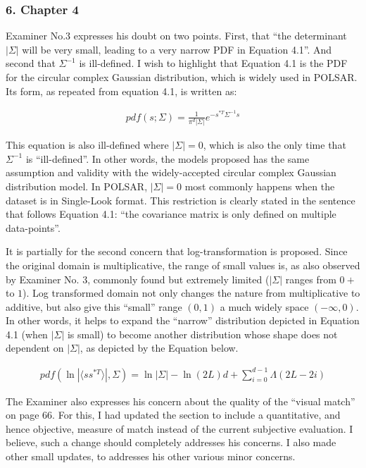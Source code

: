 \subsubsection*{6. Chapter 4}

Examiner No.3 expresses his doubt on two points.
First, that ``the determinant $|\Sigma|$ will be very small, leading to a very narrow PDF in Equation 4.1''.
And second that $\Sigma^{-1}$ is ill-defined.
I wish to highlight that Equation 4.1 is the PDF for the circular complex Gaussian distribution, which is widely used in POLSAR.
Its form, as repeated from equation 4.1, is written as:

\begin{align*}
  pdf(s;\Sigma)=\frac{1}{\pi^d |\Sigma|} e^{-s^{*T}\Sigma^{-1}s}
\end{align*}  

This equation is also ill-defined where $|\Sigma|=0$, which is also the only time that $\Sigma^{-1}$ is ``ill-defined''.
In other words, the models proposed has the same assumption and validity with the widely-accepted circular complex Gaussian distribution model.
In POLSAR, $|\Sigma|=0$ most commonly happens when the dataset is in Single-Look format.
This restriction is clearly stated in the sentence that follows Equation 4.1: ``the covariance matrix is only defined on multiple data-points''.

It is partially for the second concern that log-transformation is proposed.
Since the original domain is multiplicative, the range of small values is, as also observed by Examiner No. 3, commonly found but extremely limited ($|\Sigma|$ ranges from $0+$ to $1$).
Log transformed domain not only changes the nature from multiplicative to additive, but also give this ``small'' range $(0,1)$ a much widely space $(-\infty,0)$.
In other words, it helps to expand the ``narrow'' distribution depicted in Equation 4.1 (when $|\Sigma|$ is small) to become another distribution whose shape does not dependent on $|\Sigma|$, as depicted by the Equation below.

\begin{align*}
  pdf( \ln | \langle ss^{*T} \rangle|, \Sigma) = \ln |\Sigma| - \ln(2L)d + \sum^{d-1}_{i=0} \Lambda (2L-2i)
\end{align*}  

The Examiner also expresses his concern about the quality of the ``visual match'' on page 66.
For this, I had updated the section to include a quantitative, and hence objective, measure of match instead of the current subjective evaluation.
I believe, such a change should completely addresses his concerns.
I also made other small updates, to addresses his other various minor concerns.

